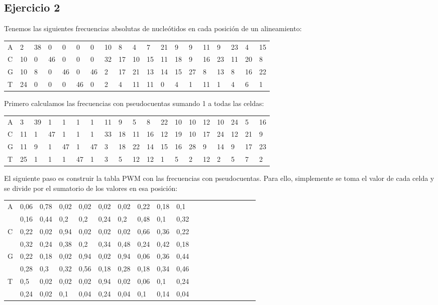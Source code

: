 \subsection{Ejercicio 2}
Tenemos las siguientes frecuencias absolutas de nucleótidos en cada posición de un alineamiento:
\begin{table}[htbp]
\begin{tabular}{l | llllllllllllllllll}
A & 2  & 38 & 0  & 0  & 0  & 0  & 10 & 8  & 4  & 7  & 21 & 9  & 9  & 11 & 9  & 23 & 4  & 15 \\
C & 10 & 0  & 46 & 0  & 0  & 0  & 32 & 17 & 10 & 15 & 11 & 18 & 9  & 16 & 23 & 11 & 20 & 8  \\
G & 10 & 8  & 0  & 46 & 0  & 46 & 2  & 17 & 21 & 13 & 14 & 15 & 27 & 8  & 13 & 8  & 16 & 22 \\
T & 24 & 0  & 0  & 0  & 46 & 0  & 2  & 4  & 11 & 11 & 0  & 4  & 1  & 11 & 1  & 4  & 6  & 1 
\end{tabular}
\end{table}

Primero calculamos las frecuencias con pseudocuentas sumando 1 a todas las celdas:
\begin{table}[htbp]
\begin{tabular}{l | llllllllllllllllll}
A & 3  & 39 & 1  & 1  & 1  & 1  & 11 & 9  & 5  & 8  & 22 & 10 & 10 & 12 & 10 & 24 & 5  & 16 \\
C & 11 & 1  & 47 & 1  & 1  & 1  & 33 & 18 & 11 & 16 & 12 & 19 & 10 & 17 & 24 & 12 & 21 & 9  \\
G & 11 & 9  & 1  & 47 & 1  & 47 & 3  & 18 & 22 & 14 & 15 & 16 & 28 & 9  & 14 & 9  & 17 & 23 \\
T & 25 & 1  & 1  & 1  & 47 & 1  & 3  & 5  & 12 & 12 & 1  & 5  & 2  & 12 & 2  & 5  & 7  & 2 
\end{tabular}
\end{table} 

El siguiente paso es construir la tabla PWM con las frecuencias con pseudocuentas. Para ello, simplemente se toma el valor de cada celda y se divide por el sumatorio de los valores en esa posición: 
\begin{table}[htbp]
\begin{tabular}{l | llllllllllllllllll}
A & 0,06 & 0,78 & 0,02 & 0,02 & 0,02 & 0,02 & 0,22 & 0,18 & 0,1  \\
& 0,16 & 0,44 & 0,2  & 0,2  & 0,24 & 0,2  & 0,48 & 0,1  & 0,32 \\
C & 0,22 & 0,02 & 0,94 & 0,02 & 0,02 & 0,02 & 0,66 & 0,36 & 0,22 \\
& 0,32 & 0,24 & 0,38 & 0,2  & 0,34 & 0,48 & 0,24 & 0,42 & 0,18 \\
G & 0,22 & 0,18 & 0,02 & 0,94 & 0,02 & 0,94 & 0,06 & 0,36 & 0,44 \\
& 0,28 & 0,3  & 0,32 & 0,56 & 0,18 & 0,28 & 0,18 & 0,34 & 0,46 \\
T & 0,5  & 0,02 & 0,02 & 0,02 & 0,94 & 0,02 & 0,06 & 0,1  & 0,24 \\
& 0,24 & 0,02 & 0,1  & 0,04 & 0,24 & 0,04 & 0,1  & 0,14 & 0,04
\end{tabular}
\end{table}

